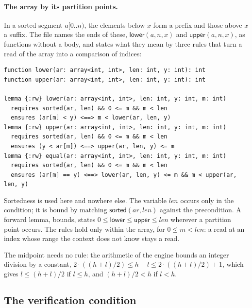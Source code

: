 \documentclass[11pt,a4paper]{article}
\newcommand{\lemma}[1]{\textsf{#1}}
\begin{document}
\paragraph{The array by its partition points.} In a sorted segment $a[0..n)$, the elements below $x$ form a prefix
and those above $x$ a suffix. The file names the ends of these, $\mathsf{lower}(a, n, x)$ and
$\mathsf{upper}(a, n, x)$, as functions without a body, and states what they mean by three rules that turn a read
of the array into a comparison of indices:
\begin{lstlisting}
function lower(ar: array<int, int>, len: int, y: int): int
function upper(ar: array<int, int>, len: int, y: int): int

lemma {:rw} lower(ar: array<int, int>, len: int, y: int, m: int)
  requires sorted(ar, len) && 0 <= m && m < len
  ensures (ar[m] < y) <==> m < lower(ar, len, y)
lemma {:rw} upper(ar: array<int, int>, len: int, y: int, m: int)
  requires sorted(ar, len) && 0 <= m && m < len
  ensures (y < ar[m]) <==> upper(ar, len, y) <= m
lemma {:rw} equal(ar: array<int, int>, len: int, y: int, m: int)
  requires sorted(ar, len) && 0 <= m && m < len
  ensures (ar[m] == y) <==> lower(ar, len, y) <= m && m < upper(ar, len, y)
\end{lstlisting}
Sortedness is used here and nowhere else. The variable $len$ occurs only in the condition; it is bound by matching
$\mathsf{sorted}(ar, len)$ against the precondition. A forward lemma, \lemma{bounds}, states
$0 \le \mathsf{lower} \le \mathsf{upper} \le len$ wherever a partition point occurs. The rules hold only within the
array, for $0 \le m < len$: a read at an index whose range the context does not know stays a read.

The midpoint needs no rule: the arithmetic of the engine bounds an integer division by a constant,
$2 \cdot ((h + l)/2) \le h + l \le 2 \cdot ((h + l)/2) + 1$, which gives $l \le (h + l)/2$ if $l \le h$, and
$(h + l)/2 < h$ if $l < h$.

\subsection{The verification condition}
\end{document}
